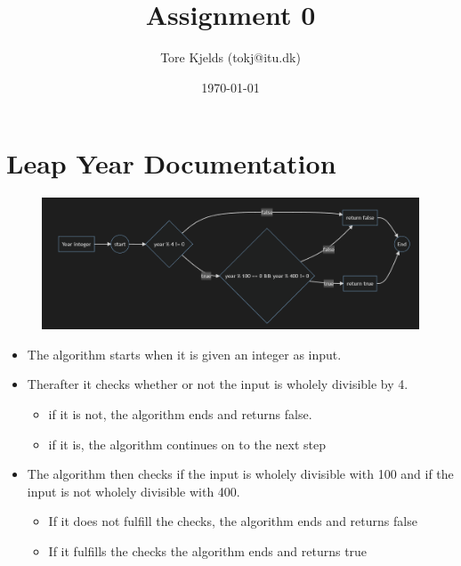 \documentclass{article}
\title{Assignment 0}
\author{Tore Kjelds (tokj@itu.dk)}
\date{\today}
\begin{document}
\maketitle
\section*{Leap Year Documentation}
\begin{figure}[!htb]
    \includegraphics[scale = 0.5]{img/Flowchart_Leap_Year.png}
\end{figure}

\begin{itemize}
    \item The algorithm starts when it is given an integer as input.
    \item Therafter it checks whether or not the input is wholely divisible by 4. 
    \begin{itemize}
        \item if it is not, the algorithm ends and returns false.
        \item if it is, the algorithm continues on to the next step
    \end{itemize}
    \item The algorithm then checks if the input is wholely divisible with 100 and if the input is not wholely divisible with 400.
    \begin{itemize}
        \item If it does not fulfill the checks, the algorithm ends and returns false
        \item If it fulfills the checks the algorithm ends and returns true
    \end{itemize}
\end{itemize}
\end{document}
